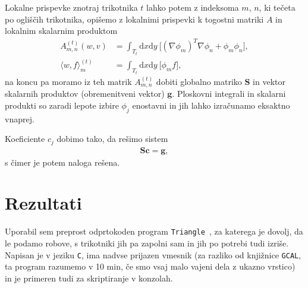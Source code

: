 \documentclass[a4 paper, 12pt]{article}
\renewcommand{\d}{
	\ensuremath{\mathrm{d}}
}
\begin{document}
Lokalne prispevke znotraj trikotnika $t$ lahko potem z indeksoma $m$, $n$, ki te\v ceta po
ogli\v s\v cih trikotnika, opi\v semo z lokalnimi prispevki k togostni matriki $A$ in lokalnim
skalarnim produktom
\begin{align*}
	A^{(t)}_{m,n} (w, v) &= \int_{T_t} \d x\d y\ \big[(\nabla \phi_m)^T \nabla \phi_n+ \phi_m
		\phi_n\big], \\
		\langle w, f\rangle_m^{(t)} &= \int_{T_t} \d x\d y\ \big[\phi_m f\big],
\end{align*}
na koncu pa moramo iz teh matrik $A_{m,n}^{(t)}$ dobiti globalno matriko $\mathbf{S}$ in vektor
skalarnih produktov (obremenitveni vektor) $\mathbf{g}$. Ploskovni integrali in skalarni produkti
so zaradi lepote izbire $\phi_j$ enostavni in jih lahko izra\v cunamo eksaktno vnaprej.

Koeficiente $c_j$ dobimo tako, da re\v simo sistem
\begin{align*}
	\mathbf{S} \mathbf{c} = \mathbf{g},
\end{align*}
s \v cimer je potem naloga re\v sena.


\section{Rezultati}
Uporabil sem preprost odprtokoden program \texttt{Triangle}~\cite{triangle},
za katerega je dovolj, da le podamo robove, s trikotniki jih pa zapolni sam in jih po potrebi
tudi izri\v se. Napisan je v jeziku {\tt C}, ima nadvse prijazen vmesnik (za razliko od knji\v znice
{\tt GCAL}, ta program razumemo v 10 min, \v ce smo vsaj malo vajeni dela z ukazno vrstico)
in je primeren tudi za skriptiranje v konzolah.
\end{document}
